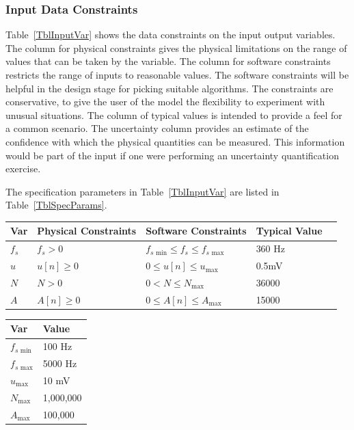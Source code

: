 \documentclass[12pt]{article}
\begin{document}

\subsubsection{Input Data Constraints} \label{sec_DataConstraints}    

Table~\ref{TblInputVar} shows the data constraints on the input output
variables.  The column for physical constraints gives the physical limitations
on the range of values that can be taken by the variable.  The column for
software constraints restricts the range of inputs to reasonable values.  The
software constraints will be helpful in the design stage for picking suitable
algorithms.  The constraints are conservative, to give the user of the model the
flexibility to experiment with unusual situations.  The column of typical values
is intended to provide a feel for a common scenario.  The uncertainty column
provides an estimate of the confidence with which the physical quantities can be
measured.  This information would be part of the input if one were performing an
uncertainty quantification exercise.

The specification parameters in Table~\ref{TblInputVar} are listed in
Table~\ref{TblSpecParams}.

\begin{table}[!h]
  \caption{Input Variables} \label{TblInputVar}
  \renewcommand{\arraystretch}{1.2}
\noindent \begin{longtable*}{l l l l c} 
  \toprule
  \textbf{Var} & \textbf{Physical Constraints} & \textbf{Software Constraints} &
                             \textbf{Typical Value}\\
  \midrule 
  $f_s$ & $f_s > 0$ & $f_{s\text{ min}} \leq f_s \leq f_{s\text{ max}}$ & 360
  \si[per-mode=symbol] {\hertz} \\
  $u$ & $u[n] \geq 0$ & $0 \leq u[n] \leq u_{\text{max}}$ & 0.5\si{\mV} \\
  $N$ & $N > 0$ & $0 < N \leq N_{\text{max}}$ & 36000 \\
  $A$ & $A[n] \geq 0$ & $0 \leq A[n] \leq A_{\text{max}}$ & 15000 \\
  \bottomrule
\end{longtable*}
\end{table}

\begin{table}[!h]
\caption{Specification Parameter Values} \label{TblSpecParams}
\renewcommand{\arraystretch}{1.2}
\noindent \begin{longtable*}{l l} 
  \toprule
  \textbf{Var} & \textbf{Value} \\
  \midrule 
  $f_{s\text{ min}}$ & 100 \si{\hertz}\\
  $f_{s\text{ max}}$ & 5000 \si{\hertz}\\
  $u_{\text{max}}$ & 10 \si{\mV}\\
  $N_{\text{max}}$ & 1,000,000 \\
  $A_{\text{max}}$ & 100,000 \\
  \bottomrule
\end{longtable*}
\end{table}
\end{document}
